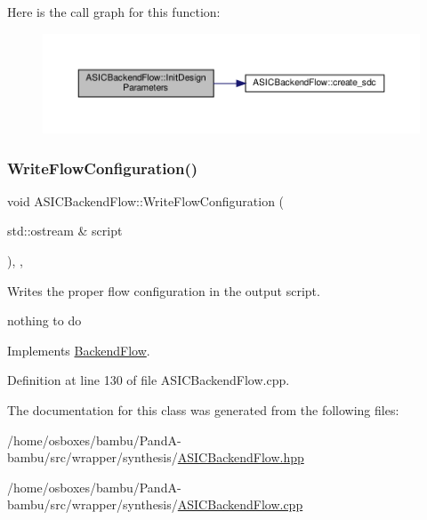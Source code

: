 Here is the call graph for this function\+:
\nopagebreak
\begin{figure}[H]
\begin{center}
\leavevmode
\includegraphics[width=350pt]{d2/d69/classASICBackendFlow_a57e6be510f2b198c19d47cc6e7e2d0ab_cgraph}
\end{center}
\end{figure}
\mbox{\label{classASICBackendFlow_ad296b0fd80a9e230b178d28aba056ac0}} 
\subsubsection{\texorpdfstring{Write\+Flow\+Configuration()}{WriteFlowConfiguration()}}
{\footnotesize\ttfamily void A\+S\+I\+C\+Backend\+Flow\+::\+Write\+Flow\+Configuration (\begin{DoxyParamCaption}\item[{std\+::ostream \&}]{script }\end{DoxyParamCaption})\hspace{0.3cm}{\ttfamily [override]}, {\ttfamily [private]}, {\ttfamily [virtual]}}



Writes the proper flow configuration in the output script. 

nothing to do 

Implements \hyperlink{classBackendFlow_acd93b1846b958eb6b7e10b9894bf5615}{Backend\+Flow}.



Definition at line 130 of file A\+S\+I\+C\+Backend\+Flow.\+cpp.



The documentation for this class was generated from the following files\+:\begin{DoxyCompactItemize}
\item 
/home/osboxes/bambu/\+Pand\+A-\/bambu/src/wrapper/synthesis/\hyperlink{ASICBackendFlow_8hpp}{A\+S\+I\+C\+Backend\+Flow.\+hpp}\item 
/home/osboxes/bambu/\+Pand\+A-\/bambu/src/wrapper/synthesis/\hyperlink{ASICBackendFlow_8cpp}{A\+S\+I\+C\+Backend\+Flow.\+cpp}\end{DoxyCompactItemize}
